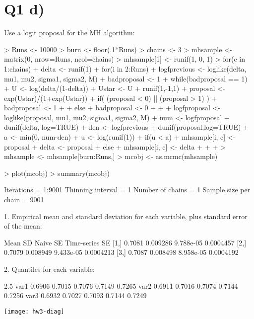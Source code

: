 \documentclass{article}
\begin{document}
\section*{Q1 d)}
Use a logit proposal for the MH algorithm:
\begin{Schunk}
\begin{Sinput}
> Runs <- 10000
> burn <- floor(.1*Runs)
> chains <- 3
> mhsample <- matrix(0, nrow=Runs, ncol=chains)
> mhsample[1] <- runif(1, 0, 1)
> for(c in 1:chains){
+   delta <- runif(1)
+   for(i in 2:Runs){
+     logfprevious <- loglike(delta, mu1, mu2, sigma1, sigma2, M)
+     badproposal <- 1
+     while(badproposal == 1){
+       U <- log(delta/(1-delta))
+       Ustar <- U + runif(1,-1,1)
+       proposal <- exp(Ustar)/(1+exp(Ustar))
+       if( (proposal < 0) || (proposal > 1) ){
+         badproposal <- 1
+       }
+       else{
+         badproposal <- 0
+       }
+     }
+     logfproposal <- loglike(proposal, mu1, mu2, sigma1, sigma2, M)
+     num <-  logfproposal + dunif(delta, log=TRUE)
+     den <- logfprevious + dunif(proposal,log=TRUE)
+     a <- min(0, num-den)
+     u <- log(runif(1))
+     if(u < a){
+       mhsample[i, c] <- proposal 
+       delta <- proposal
+     }else{
+       mhsample[i, c] <- delta
+     }
+   }
+ }
> mhsample <- mhsample[burn:Runs,]
> mcobj <- as.mcmc(mhsample)
\end{Sinput}
\end{Schunk}

\begin{Schunk}
\begin{Sinput}
> plot(mcobj)
> summary(mcobj)
\end{Sinput}
\begin{Soutput}
Iterations = 1:9001
Thinning interval = 1 
Number of chains = 1 
Sample size per chain = 9001 

1. Empirical mean and standard deviation for each variable,
   plus standard error of the mean:

       Mean       SD  Naive SE Time-series SE
[1,] 0.7081 0.009286 9.788e-05      0.0004457
[2,] 0.7079 0.008949 9.433e-05      0.0004213
[3,] 0.7087 0.008498 8.958e-05      0.0004192

2. Quantiles for each variable:

       2.5%    25%    50%    75%  97.5%
var1 0.6906 0.7015 0.7076 0.7149 0.7265
var2 0.6911 0.7016 0.7074 0.7144 0.7256
var3 0.6932 0.7027 0.7093 0.7144 0.7249
\end{Soutput}
\end{Schunk}
\texttt{[image: hw3-diag]}
\end{document}

